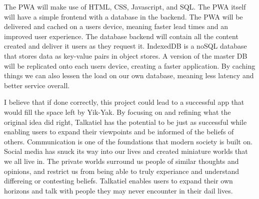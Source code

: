 \documentclass[12pt]{article}
\begin{document}
The PWA will make use of HTML, CSS, Javascript, and SQL.  The PWA itself will have a simple frontend with a database in the backend.  The PWA will be delivered and cached on a users device, meaning faster lead times and an improved user experience.  The database backend will contain all the content created and deliver it users as they request it.  IndexedDB is a noSQL database that stores data as key-value pairs in object stores.  A version of the master DB will be replicated onto each users device, creating a faster application.  By caching things we can also lessen the load on our own database, meaning less latency and better service overall.

I believe that if done correctly, this project could lead to a successful app that would fill the space left by Yik-Yak.  By focusing on and refining what the original idea did right, Talkatiel has the potential to be just as successful while enabling users to expand their viewpoints and be informed of the beliefs of others.  Communication is one of the foundations that modern society is built on.  Social media has snuck its way into our lives and created miniature worlds that we all live in.  The private worlds surround us people of similar thoughts and opinions, and restrict us from being able to truly experiance and understand differeing or contesting beliefs.  Talkatiel enables users to expand their own horizons and talk with people they may never encounter in their dail lives.
\end{document}
